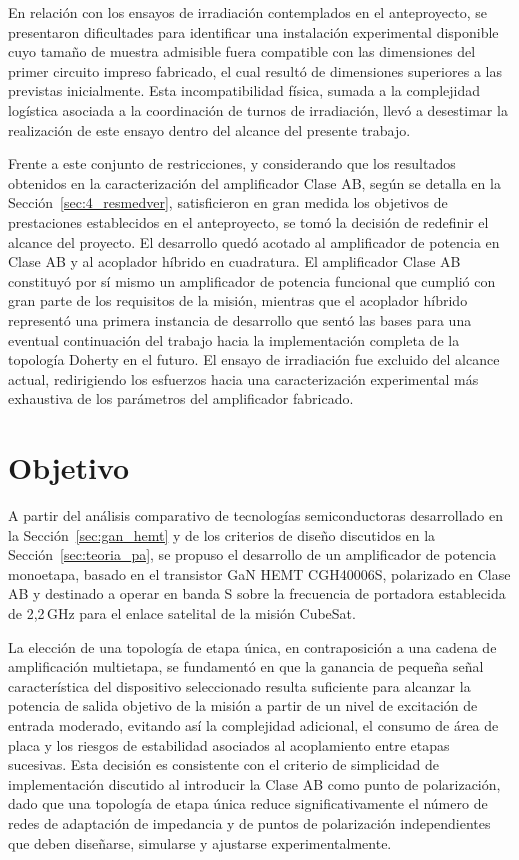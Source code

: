 En relación con los ensayos de irradiación contemplados en el anteproyecto, se presentaron dificultades para identificar una instalación experimental disponible cuyo tamaño de muestra admisible fuera compatible con las dimensiones del primer circuito impreso fabricado, el cual resultó de dimensiones superiores a las previstas inicialmente. Esta incompatibilidad física, sumada a la complejidad logística asociada a la coordinación de turnos de irradiación, llevó a desestimar la realización de este ensayo dentro del alcance del presente trabajo.

Frente a este conjunto de restricciones, y considerando que los resultados obtenidos en la caracterización del amplificador Clase AB, según se detalla en la Sección~\ref{sec:4_resmedver}, satisficieron en gran medida los objetivos de prestaciones establecidos en el anteproyecto, se tomó la decisión de redefinir el alcance del proyecto. El desarrollo quedó acotado al amplificador de potencia en Clase AB y al acoplador híbrido en cuadratura. El amplificador Clase AB constituyó por sí mismo un amplificador de potencia funcional que cumplió con gran parte de los requisitos de la misión, mientras que el acoplador híbrido representó una primera instancia de desarrollo que sentó las bases para una eventual continuación del trabajo hacia la implementación completa de la topología Doherty en el futuro. El ensayo de irradiación fue excluido del alcance actual, redirigiendo los esfuerzos hacia una caracterización experimental más exhaustiva de los parámetros del amplificador fabricado.

\section{Objetivo}
A partir del análisis comparativo de tecnologías semiconductoras desarrollado en la Sección~\ref{sec:gan_hemt} y de los criterios de diseño discutidos en la Sección~\ref{sec:teoria_pa}, se propuso el desarrollo de un amplificador de potencia monoetapa, basado en el transistor GaN HEMT CGH40006S, polarizado en Clase AB y destinado a operar en banda S sobre la frecuencia de portadora establecida de 2,2\,GHz para el enlace satelital de la misión CubeSat.

La elección de una topología de etapa única, en contraposición a una cadena de amplificación multietapa, se fundamentó en que la ganancia de pequeña señal característica del dispositivo seleccionado resulta suficiente para alcanzar la potencia de salida objetivo de la misión a partir de un nivel de excitación de entrada moderado, evitando así la complejidad adicional, el consumo de área de placa y los riesgos de estabilidad asociados al acoplamiento entre etapas sucesivas. Esta decisión es consistente con el criterio de simplicidad de implementación discutido al introducir la Clase AB como punto de polarización, dado que una topología de etapa única reduce significativamente el número de redes de adaptación de impedancia y de puntos de polarización independientes que deben diseñarse, simularse y ajustarse experimentalmente.

